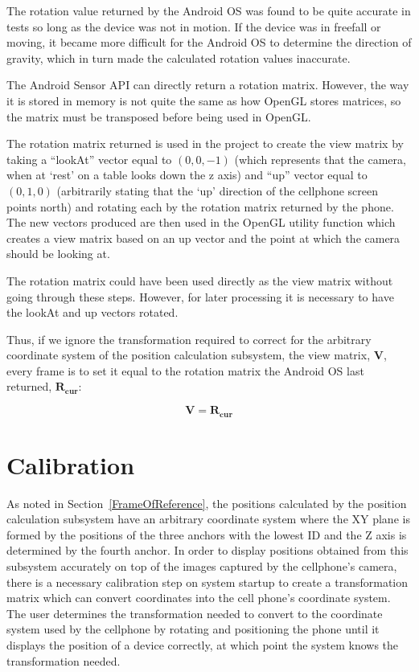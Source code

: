 The rotation value returned by the Android OS was found to be quite accurate in tests so long as the device was not in motion. If the device was in freefall or moving, it became more difficult for the Android OS to determine the direction of gravity, which in turn made the calculated rotation values inaccurate.

The Android Sensor API can directly return a rotation matrix. However, the way it is stored in memory is not quite the same as how OpenGL stores matrices, so the matrix must be transposed before being used in OpenGL.

The rotation matrix returned is used in the project to create the view matrix by taking a ``lookAt'' vector equal to $(0, 0, -1)$ (which represents that the camera, when at `rest' on a table looks down the z axis) and ``up'' vector equal to $(0, 1, 0)$ (arbitrarily stating that the `up' direction of the cellphone screen points north) and rotating each by the rotation matrix returned by the phone. The new vectors produced are then used in the OpenGL utility function  which creates a view matrix based on an up vector and the point at which the camera should be looking at.

The rotation matrix could have been used directly as the view matrix without going through these steps. However, for later processing it is necessary to have the lookAt and up vectors rotated. 

Thus, if we ignore the transformation required to correct for the arbitrary coordinate system of the position calculation subsystem, the view matrix, $\mathbf{V}$, every frame is to set it equal to the rotation matrix the Android OS last returned, $\mathbf{R_{cur}}$:

\[
	\mathbf{V} = \mathbf{R_{cur}}
\]

\section{Calibration}
\label{Calibration}
As noted in Section~\ref{FrameOfReference}, the positions calculated by the position calculation subsystem have an arbitrary coordinate system where the XY plane is formed by the positions of the three anchors with the lowest ID and the Z axis is determined by the fourth anchor. In order to display positions obtained from this subsystem accurately on top of the images captured by the cellphone's camera, there is a necessary calibration step on system startup to create a transformation matrix which can convert coordinates into the cell phone's coordinate system. The user determines the transformation needed to convert to the coordinate system used by the cellphone by rotating and positioning the phone until it displays the position of a device correctly, at which point the system knows the transformation needed.


